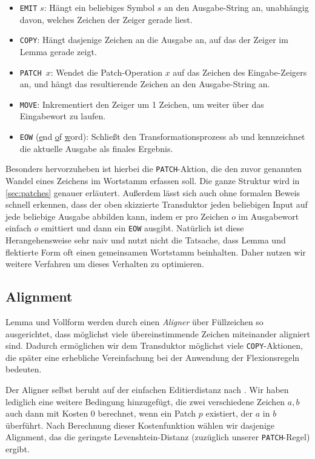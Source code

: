 \documentclass[11pt,a4paper]{article}
\newcommand{\action}[1]{\texttt{#1}}
\begin{document}
\begin{itemize}
    \item \action{EMIT} $s$: Hängt ein beliebiges Symbol $s$ an den Ausgabe-String an, unabhängig davon, welches Zeichen der Zeiger gerade liest.
    \item \action{COPY}: Hängt dasjenige Zeichen an die Ausgabe an, auf das der Zeiger im Lemma gerade zeigt.
    \item \action{PATCH $x$}: Wendet die Patch-Operation $x$ auf das Zeichen des Eingabe-Zeigers an, und hängt das resultierende Zeichen an den Ausgabe-String an.
    \item \action{MOVE}: Inkrementiert den Zeiger um 1 Zeichen, um weiter über das Eingabewort zu laufen.
    \item \action{EOW} (\underline{e}nd \underline{o}f \underline{w}ord): Schließt den Transformationsprozess ab und kennzeichnet die aktuelle Ausgabe als finales Ergebnis.
\end{itemize}

Besonders hervorzuheben ist hierbei die \action{PATCH}-Aktion, die den zuvor genannten Wandel eines Zeichens im Wortstamm erfassen soll. Die ganze Struktur wird in \autoref{sec:patches} genauer erläutert.
Außerdem lässt sich auch ohne formalen Beweis schnell erkennen, dass der oben skizzierte Transduktor jeden beliebigen Input auf jede beliebige Ausgabe abbilden kann, indem er pro Zeichen $o$ im Ausgabewort einfach $o$ emittiert und dann ein \action{EOW} ausgibt. Natürlich ist diese Herangehensweise sehr naiv und nutzt nicht die Tatsache, dass Lemma und flektierte Form oft einen gemeinsamen Wortstamm beinhalten. Daher nutzen wir weitere Verfahren um dieses Verhalten zu optimieren.

\subsection{Alignment}
\label{sec:alignment}
Lemma und Vollform werden durch einen \textit{Aligner} über Füllzeichen so ausgerichtet, dass möglichst viele übereinstimmende Zeichen miteinander aligniert sind. Dadurch ermöglichen wir dem Transduktor möglichst viele \action{COPY}-Aktionen, die später eine erhebliche Vereinfachung bei der Anwendung der Flexionsregeln bedeuten.

Der Aligner selbst beruht auf der einfachen Editierdistanz nach \citet{levenshtein:binary66}. Wir haben lediglich eine weitere Bedingung hinzugefügt, die zwei verschiedene Zeichen $a, b$ auch dann mit Kosten $0$ berechnet, wenn ein Patch $p$ existiert, der $a$ in $b$ überführt. Nach Berechnung dieser Kostenfunktion wählen wir dasjenige Alignment, das die geringste Levenshtein-Distanz (zuzüglich unserer \action{PATCH}-Regel) ergibt.
\end{document}
